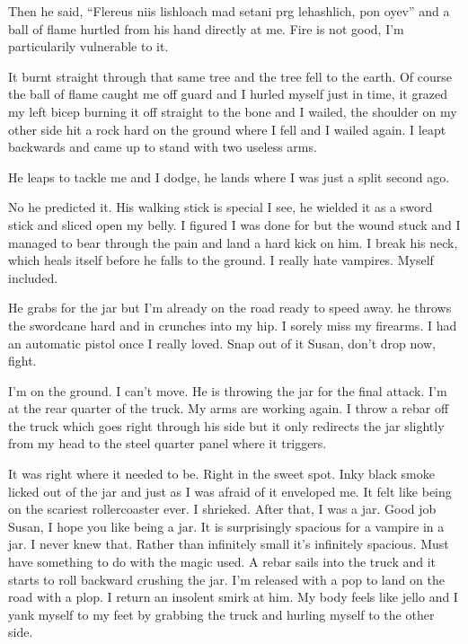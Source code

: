 Then he said, ``Flereus niis lishloach mad setani prg lehashlich, pon oyev'' and a ball of flame hurtled from his hand directly at me. Fire is not good, I'm particularily vulnerable to it.

It burnt straight through that same tree and the tree fell to the earth. Of course the ball of flame caught me off guard and I hurled myself just in time, it grazed my left bicep burning it off straight to the bone and I wailed, the shoulder on my other side hit a rock hard on the ground where I fell and I wailed again. I leapt backwards and came up to stand with two useless arms.

He leaps to tackle me and I dodge, he lands where I was just a split second ago.

No he predicted it. His walking stick is special I see, he wielded it as a sword stick and sliced open my belly. I figured I was done for but the wound stuck and I managed to bear through the pain and land a hard kick on him. I break his neck, which heals itself before he falls to the ground. I really hate vampires. Myself included.

He grabs for the jar but I'm already on the road ready to speed away. he throws the swordcane hard and in crunches into my hip. I sorely miss my firearms. I had an automatic pistol once I really loved. Snap out of it Susan, don't drop now, fight.

I'm on the ground. I can't move. He is throwing the jar for the final attack. I'm at the rear quarter of the truck. My arms are working again. I throw a rebar off the truck which goes right through his side but it only redirects the jar slightly from my head to the steel quarter panel where it triggers.

It was right where it needed to be. Right in the sweet spot. Inky black smoke licked out of the jar and just as I was afraid of it enveloped me. It felt like being on the scariest rollercoaster ever. I shrieked. After that, I was a jar. Good job Susan, I hope you like being a jar. It is surprisingly spacious for a vampire in a jar. I never knew that. Rather than infinitely small it's infinitely spacious. Must have something to do with the magic used. A rebar sails into the truck and it starts to roll backward crushing the jar. I'm released with a pop to land on the road with a plop. I return an insolent smirk at him. My body feels like jello and I yank myself to my feet by grabbing the truck and hurling myself to the other side.

